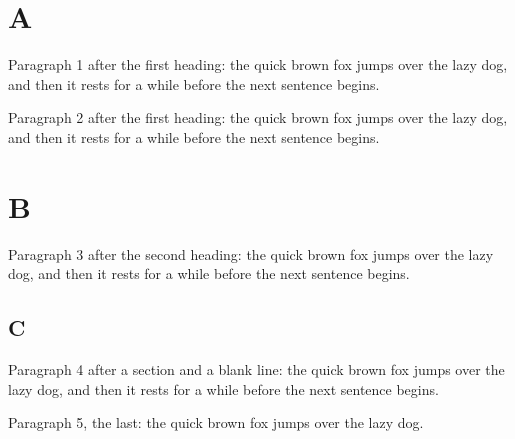 \documentclass{book}
\begin{document}
\chapter{A}\label{x}
Paragraph 1 after the first heading: the quick brown fox jumps over the lazy dog, and then it rests for a while before the next sentence begins.

Paragraph 2 after the first heading: the quick brown fox jumps over the lazy dog, and then it rests for a while before the next sentence begins.

\chapter{B}
Paragraph 3 after the second heading: the quick brown fox jumps over the lazy dog, and then it rests for a while before the next sentence begins.

\section{C}

Paragraph 4 after a section and a blank line: the quick brown fox jumps over the lazy dog, and then it rests for a while before the next sentence begins.

Paragraph 5, the last: the quick brown fox jumps over the lazy dog.
\end{document}
